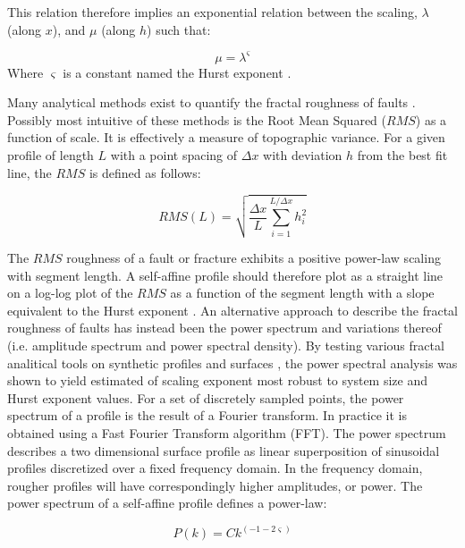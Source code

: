 \documentclass[12pt,a4paper]{article}
\begin{document}
This relation therefore implies an exponential relation between the scaling, $\lambda$ (along $x$), and $\mu$ (along $h$) such that:

\begin{equation}
\mu = \lambda^\varsigma
\end{equation}
%
Where $\varsigma$ is a constant named the Hurst exponent \cite{schmittbuhl1993field}.

Many analytical methods exist to quantify the fractal roughness of faults \cite{mandelbrot1985self, schmittbuhl1995reliability, candela2009characterization}. Possibly most intuitive of these methods is the Root Mean Squared ($RMS$) as a function of scale. It is effectively a measure of topographic variance. For a given profile of length $L$ with a point spacing of $\Delta x$ with deviation $h$ from the best fit line, the $RMS$ is defined as follows:

\begin{equation}
RMS(L)=\sqrt{\dfrac{\Delta x}{L}\sum^{L/{\Delta x}}_{i=1} h^2_i}
\end{equation}

	The $RMS$ roughness of a fault or fracture exhibits a positive power-law scaling with segment length. A self-affine profile should therefore plot as a straight line on a log-log plot of the $RMS$ as a function of the segment length with a slope equivalent to the Hurst exponent \cite{schmittbuhl1995reliability}.
	An alternative approach to describe the fractal roughness of faults has instead been the power spectrum and variations thereof (i.e. amplitude spectrum and power spectral density). By testing various fractal analitical tools on synthetic profiles \cite{schmittbuhl1995reliability} and surfaces \cite{candela2009characterization}, the power spectral analysis was shown to yield estimated of scaling exponent most robust to system size and Hurst exponent values.
	 For a set of discretely sampled points, the power spectrum of a profile is the result of a Fourier transform. In practice it is obtained using a Fast Fourier Transform algorithm (FFT). The power spectrum describes a two dimensional surface profile as linear superposition of sinusoidal profiles discretized over a fixed frequency domain. In the frequency domain, rougher profiles will have correspondingly higher amplitudes, or power. The power spectrum of a self-affine profile defines a power-law:

\begin{equation}
P(k) = Ck^{(-1-2\varsigma)}
\end{equation}
\end{document}
